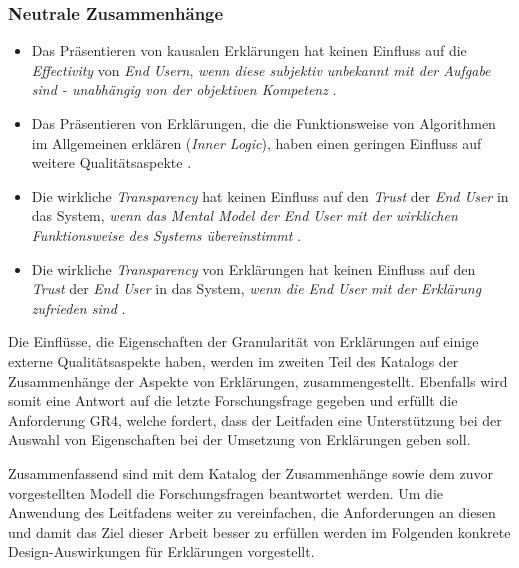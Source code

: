 \subsubsection*{Neutrale Zusammenhänge}

\begin{itemize}
    \item Das Präsentieren von kausalen Erklärungen hat keinen Einfluss auf die \textit{Effectivity} von \textit{End Usern}, \textit{wenn diese subjektiv unbekannt mit der Aufgabe sind - unabhängig von der objektiven Kompetenz} \cite{schaffer_i_2019}.
    \item Das Präsentieren von Erklärungen, die die Funktionsweise von Algorithmen im Allgemeinen erklären (\textit{Inner Logic}), haben einen geringen Einfluss auf weitere Qualitätsaspekte \cite{chazette_end-users_nodate}.
    \item Die wirkliche \textit{Transparency} hat keinen Einfluss auf den \textit{Trust} der \textit{End User} in das System, \textit{wenn das Mental Model der End User mit der wirklichen Funktionsweise des Systems übereinstimmt} \cite{eiband_impact_2019, riveiro_thats_2021}.
    \item Die wirkliche \textit{Transparency} von Erklärungen hat keinen Einfluss auf den \textit{Trust} der \textit{End User} in das System, \textit{wenn die End User mit der Erklärung zufrieden sind} \cite{eiband_impact_2019, riveiro_thats_2021}.
\end{itemize}

\smallskip

\noindent{}

\smallskip

Die Einflüsse, die Eigenschaften der Granularität von Erklärungen auf einige externe Qualitätsaspekte haben, werden im zweiten Teil des Katalogs der Zusammenhänge der Aspekte von Erklärungen, zusammengestellt. Ebenfalls wird somit eine Antwort auf die letzte Forschungsfrage gegeben und erfüllt die Anforderung GR4, welche fordert, dass der Leitfaden eine Unterstützung bei der Auswahl von Eigenschaften bei der Umsetzung von Erklärungen geben soll.

\smallskip

Zusammenfassend sind mit dem Katalog der Zusammenhänge sowie dem zuvor vorgestellten Modell die Forschungsfragen beantwortet werden. Um die Anwendung des Leitfadens weiter zu vereinfachen, die Anforderungen an diesen und damit das Ziel dieser Arbeit besser zu erfüllen werden im Folgenden konkrete Design-Auswirkungen für Erklärungen vorgestellt.

